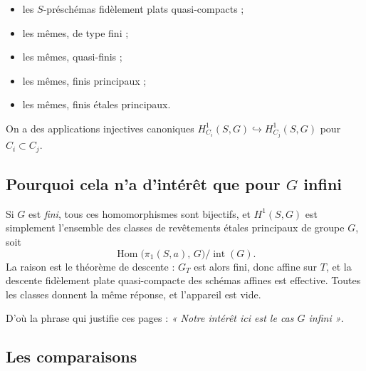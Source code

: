 \documentclass[11pt,a4paper]{article}
\begin{document}
\begin{itemize}
  \item[$C_{1}$] les $S$-préschémas fidèlement plats quasi-compacts ;
  \item[$C_{2}$] les mêmes, de type fini ;
  \item[$C_{3}$] les mêmes, quasi-finis ;
  \item[$C_{4}$] les mêmes, finis principaux ;
  \item[$C_{5}$] les mêmes, finis étales principaux.
\end{itemize}

On a des applications injectives canoniques $H^{1}_{C_{i}}(S,G)
\hookrightarrow H^{1}_{C_{j}}(S,G)$ pour $C_{i} \subset C_{j}$.

\subsection*{Pourquoi cela n'a d'intérêt que pour $G$ infini}

Si $G$ est \emph{fini}, tous ces homomorphismes sont bijectifs, et
$H^{1}(S,G)$ est simplement l'ensemble des classes de revêtements étales
principaux de groupe $G$, soit
\[
  \operatorname{Hom}\bigl(\pi_{1}(S,a),\, G\bigr) \big/
  \operatorname{int}(G) .
\]
La raison est le théorème de descente : $G_{T}$ est alors fini, donc affine sur
$T$, et la descente fidèlement plate quasi-compacte des schémas affines est
effective. Toutes les classes donnent la même réponse, et l'appareil est vide.

D'où la phrase qui justifie ces pages : \emph{« Notre intérêt ici est le cas $G$
infini »}.

\subsection*{Les comparaisons}
\end{document}
